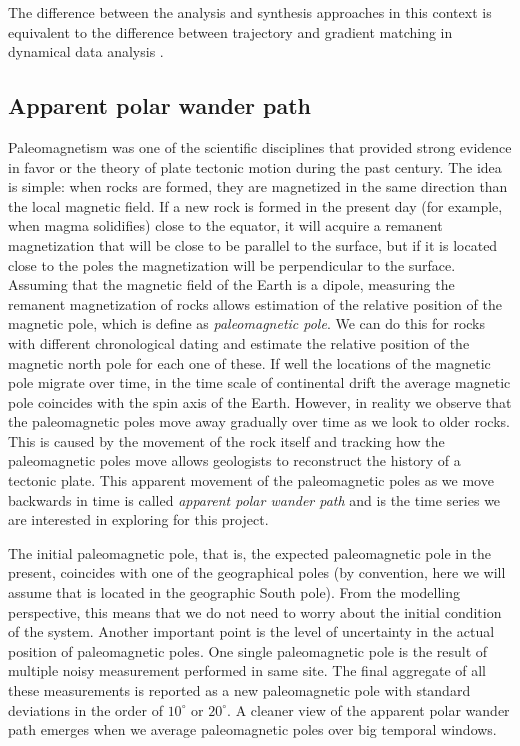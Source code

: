 The difference between the analysis and synthesis approaches \cite{synthesis-analysis} in this context is equivalent to the difference between trajectory and gradient matching in dynamical data analysis \cite{ramsay2017dynamic}.

\subsection{Apparent polar wander path}

Paleomagnetism was one of the scientific disciplines that provided strong evidence in favor or the theory of plate tectonic motion during the past century. 
The idea is simple: when rocks are formed, they are magnetized in the same direction than the local magnetic field. 
If a new rock is formed in the present day (for example, when magma solidifies) close to the equator, it will acquire a remanent magnetization that will be close to be parallel to the surface, but if it is located close to the poles the magnetization will be perpendicular to the surface. 
Assuming that the magnetic field of the Earth is a dipole, measuring the remanent magnetization of rocks allows estimation of the relative position of the magnetic pole, which is define as \textit{paleomagnetic pole}. 
We can do this for rocks with different chronological dating and estimate the relative position of the magnetic north pole for each one of these. 
If well the locations of the magnetic pole migrate over time, in the time scale of continental drift the average magnetic pole coincides with the spin axis of the Earth. 
However, in reality we observe that the paleomagnetic poles move away gradually over time as we look to older rocks. 
This is caused by the movement of the rock itself and tracking how the paleomagnetic poles move allows geologists to reconstruct the history of a tectonic plate. 
This apparent movement of the paleomagnetic poles as we move backwards in time is called \textit{apparent polar wander path} and is the time series we are interested in exploring for this project. 

The initial paleomagnetic pole, that is, the expected paleomagnetic pole in the present, coincides with one of the geographical poles (by convention, here we will assume that is located in the geographic South pole). 
From the modelling perspective, this means that we do not need to worry about the initial condition of the system. 
Another important point is the level of uncertainty in the actual position of paleomagnetic poles. One single paleomagnetic pole is the result of multiple noisy measurement performed in same site. 
The final aggregate of all these measurements is reported as a new paleomagnetic pole with standard deviations in the order of $10^\circ$ or $20^\circ$. 
A cleaner view of the apparent polar wander path emerges when we average paleomagnetic poles over big temporal windows. 

